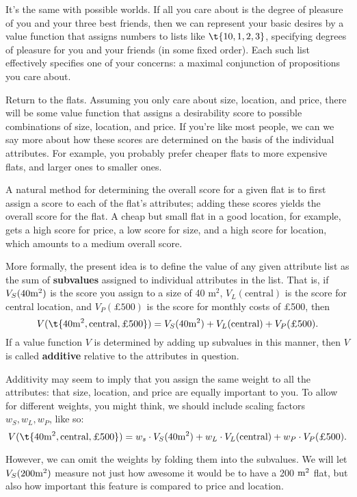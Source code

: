 It's the same with possible worlds. If all you care about is the
degree of pleasure of you and your three best friends, then we can
represent your basic desires by a value function that assigns numbers
to lists like $\t{10, 1, 2, 3}$, specifying degrees of pleasure for
you and your friends (in some fixed order). Each such list effectively
specifies one of your concerns: a maximal conjunction of propositions
you care about.

Return to the flats. Assuming you only care about size, location, and
price, there will be some value function that assigns a desirability
score to possible combinations of size, location, and price. If you're
like most people, we can we say more about how these scores are
determined on the basis of the individual attributes. For example, you
probably prefer cheaper flats to more expensive flats, and larger ones
to smaller ones.

A natural method for determining the overall score for a given flat is to first
assign a score to each of the flat's attributes; adding these scores yields the
overall score for the flat. A cheap but small flat in a good location, for
example, gets a high score for price, a low score for size, and a high score for
location, which amounts to a medium overall score.

More formally, the present idea is to define the value of any given
attribute list as the sum of \textbf{subvalues} assigned to individual
attributes in the list. That is, if $V_{S}(40 \text{m}^2)$ is the score you
assign to a size of 40 m$^2$, $V_{L}(\text{central})$ is the score for
central location, and $V_{P}(\text{£500})$ is the score for monthly
costs of £500, then
\[
V(\t{40 \m^2, \text{central}, \text{£500}}) = V_{S}(40 \m^2) +
V_{L}(\text{central}) + V_{P}(\text{£500}).
\]
%
If a value function $V$ is determined by adding up subvalues
in this manner, then $V$ is called \textbf{additive} relative to the
attributes in question.

Additivity may seem to imply that you assign the same weight to
all the attributes: that size, location, and price are equally
important to you. To allow for different weights, you might think, we
should include scaling factors $w_S, w_L, w_P$, like so:
\[
V(\t{40 \m^2, \text{central}, \text{£500}}) = w_s \cdot V_{S}(40 \m^2) +
w_L \cdot V_{L}(\text{central}) + w_P \cdot V_{P}(\text{£500}).
\]

However, we can omit the weights by folding them into the
subvalues. We will let $V_S(200 \text{m}^2)$ measure not just how
awesome it would be to have a 200 $\text{m}^2$ flat, but also how important
this feature is compared to price and location.

